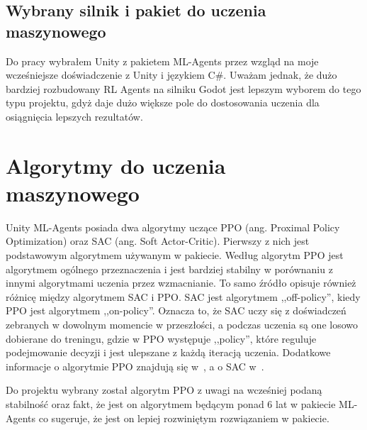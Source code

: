 \documentclass{SGGW-thesis}
\begin{document}
\subsection*{Wybrany silnik i pakiet do uczenia maszynowego}
Do pracy wybrałem Unity z pakietem ML-Agents przez wzgląd na moje wcześniejsze doświadczenie z Unity i językiem C\#. Uważam jednak, że dużo bardziej rozbudowany RL Agents na silniku Godot jest lepszym wyborem do tego typu projektu, gdyż daje dużo większe pole do dostosowania uczenia dla osiągnięcia lepszych rezultatów.


\section{Algorytmy do uczenia maszynowego}
\label{algorithms}
Unity ML-Agents posiada dwa algorytmy uczące PPO (ang. Proximal Policy Optimization) oraz SAC (ang. Soft Actor-Critic). Pierwszy z nich jest podstawowym algorytmem używanym w pakiecie. Według \cite{MLAgentsDocs} algorytm PPO jest algorytmem ogólnego przeznaczenia i jest bardziej stabilny w porównaniu z innymi algorytmami uczenia przez wzmacnianie.
To samo źródło opisuje również różnicę między algorytmem SAC i PPO. SAC jest algorytmem ,,off-policy'', kiedy PPO jest algorytmem ,,on-policy''. Oznacza to, że SAC uczy się z doświadczeń zebranych w dowolnym momencie w przeszłości, a podczas uczenia są one losowo dobierane do treningu, gdzie w PPO występuje ,,policy'',
które reguluje podejmowanie decyzji i jest ulepszane z każdą iteracją uczenia. Dodatkowe informacje o algorytmie PPO znajdują się w~\cite{PPOArticle}, a o SAC w~\cite{SACArticle}. 

\pagebreak
Do projektu wybrany został algorytm PPO z uwagi na wcześniej podaną stabilność oraz fakt, że jest on algorytmem będącym ponad 6 lat w pakiecie ML-Agents co sugeruje, że jest on lepiej rozwiniętym rozwiązaniem w pakiecie.
\end{document}
